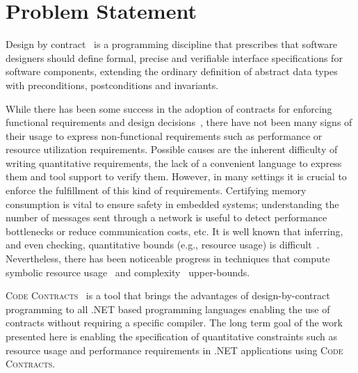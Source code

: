 \section{Problem Statement}
Design by contract~\cite{Meyer:OOP} is a programming discipline that prescribes that software designers should define formal, precise and verifiable interface specifications for software components, extending the ordinary definition of abstract data types with preconditions, postconditions and invariants.  %
%

While there has been some success in the adoption of contracts for enforcing functional requirements and design decisions~\cite{leavens00jml,Meyer:Eiffel}, there have not been many signs of their usage to express non-functional requirements such as performance or resource utilization requirements.  
Possible causes are the inherent difficulty of writing quantitative requirements, the lack of a convenient language to express them and tool support to verify them. 
However, in many settings it is crucial to enforce the fulfillment of this kind of requirements. Certifying memory consumption is vital to ensure safety in embedded systems; understanding the number of messages sent through a network is useful to detect performance bottlenecks or reduce communication costs, etc. 
It is well known that inferring, and even checking, quantitative bounds (e.g., resource usage) is  difficult~\cite{garber08ismm}. Nevertheless, there has been noticeable progress in techniques that compute symbolic resource usage~\cite{garber08ismm, AlbertGG09} and complexity~\cite{gulwani2010reachability} upper-bounds.

\textsc{Code Contracts}~\cite{fahndrich2010embedded} is a tool that brings the advantages of design-by-contract programming to all .NET based programming languages enabling the use of contracts without requiring a specific compiler. 
The long term  goal of the work presented here is  enabling the specification of quantitative constraints such as resource usage and performance requirements in .NET applications using \textsc{Code Contracts}. 

